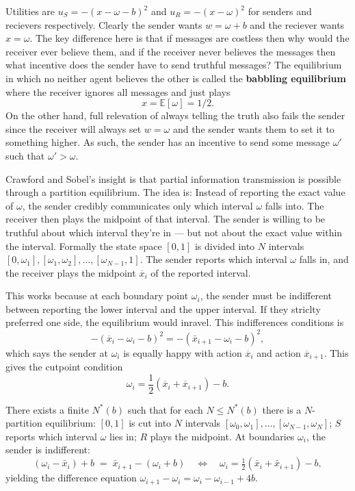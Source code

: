 \documentclass[11pt,english]{article}
\begin{document}
Utilities are $u_S = -(x - \omega - b)^2$ and $u_R = -(x - \omega)^2$ for senders and recievers respectively. Clearly the sender wants $w = \omega + b$ and the reciever wants $x = \omega$. The key difference here is that if messages are costless then why would the receiver ever believe them, and if the receiver never believes the messages then what incentive does the sender have to send truthful messages? The equilibrium in which no neither agent believes the other is called the \textbf{babbling equilibrium} where the receiver ignores all messages and just plays $$x = \mathbb{E}[\omega] = 1/2.$$On the other hand, full relevation of always telling the truth also fails the sender since the receiver will always set $w = \omega$ and the sender wants them to set it to something higher. As such, the sender has an incentive to send some message $\omega'$ such that $\omega' > \omega$.

Crawford and Sobel's insight is that partial information transmission is possible through a partition equilibrium. The idea is: Instead of reporting the exact value of $\omega$, the sender credibly communicates only which interval $\omega$ falls into. The receiver then plays the midpoint of that interval. The sender is willing to be truthful about which interval they're in — but not about the exact value within the interval. Formally the state space $[0,1]$ is divided into $N$ intervals $[0, \omega_1], [\omega_1, \omega_2], \ldots, [\omega_{N-1}, 1]$. The sender reports which interval $\omega$ falls in, and the receiver plays the midpoint $\overline{x}_i$ of the reported interval.

This works because at each boundary point $\omega_i$, the sender must be indifferent between reporting the lower interval and the upper interval. If they striclty preferred one side, the equilibrium would inravel. This indifferences conditions is $$-(\overline{x}_i - \omega_i - b)^2 = -(\bar{x}_{i+1} - \omega_i - b)^2,$$which says the sender at $\omega_i$ is equally happy with action $\overline{x}_i$ and action $\overline{x}_{i+1}$. This gives the cutpoint condition $$\omega_i = \frac{1}{2}(\overline{x}_i + \overline{x}_{i+1}) - b.$$

\begin{theorem}
There exists a finite $N^*(b)$ such that for each $N\le N^*(b)$ there is a $N$-partition equilibrium: $[0,1]$ is cut into $N$ intervals $[\omega_0,\omega_1],\ldots,[\omega_{N-1},\omega_N]$; $S$ reports which interval $\omega$ lies in; $R$ plays the midpoint. At boundaries $\omega_i$, the sender is indifferent:
\[
  (\omega_i - \bar x_i) + b \;=\; \bar x_{i+1} - (\omega_i + b)
  \quad\Leftrightarrow\quad
  \omega_i = \tfrac12(\bar x_i + \bar x_{i+1}) - b,
\]
yielding the difference equation $\omega_{i+1}-\omega_i = \omega_i-\omega_{i-1} + 4b$.
\end{theorem}
\end{document}
